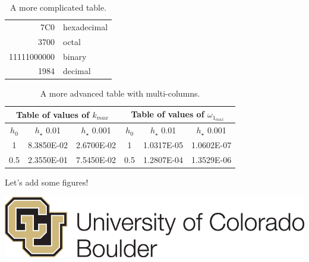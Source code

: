 \documentclass{article}
\begin{document}
\begin{table}[ht] %
\centering %
\begin{tabular}{|r|l|}
  \hline
  7C0 & hexadecimal \\
  3700 & octal \\ \cline{2-2} %
  11111000000 & binary \\
  \hline \hline
  1984 & decimal \\
  \hline
\end{tabular}
\caption{A more complicated table.}
\end{table}

\begin{table}[ht] %
    \centering
    \begin{tabular}{|c|c|c|c|c|c|}
    \hline
    \multicolumn{3}{|c|}{Table of values of $k_{max}$} & \multicolumn{3}{|c|}{Table of values of $\omega_{1_{max}}$} \\ \hline
    $h_0$    & $h_{\star}$ 0.01 & $h_{\star}$ 0.001 & $h_0$    & $h_{\star}$ 0.01 & $h_{\star}$ 0.001 \\ \hline
    1     & 8.3850E-02 & 2.6700E-02 & 1     & 1.0317E-05 & 1.0602E-07 \\ \hline
    0.5   & 2.3550E-01 & 7.5450E-02 & 0.5   & 1.2807E-04 & 1.3529E-06 \\ \hline
    \end{tabular}
    \caption{A more advanced table with multi-columns.}
  \label{tab:ABoringTable}
\end{table}

\clearpage %
Let's add some figures!

\vspace{3em}

\includegraphics[width=0.49\linewidth]{Images/CUBoulderLogo.png}

\vspace{3em}
\end{document}
